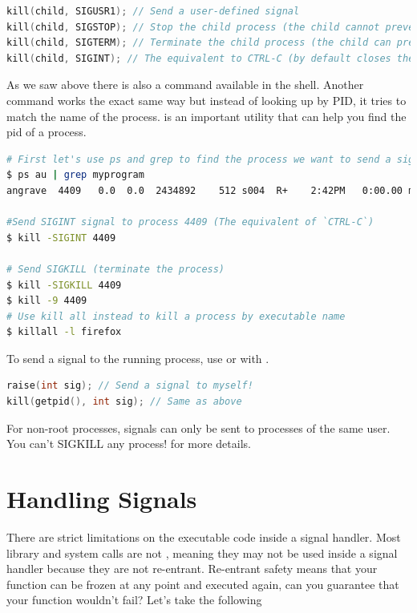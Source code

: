 \begin{lstlisting}[language=C]
kill(child, SIGUSR1); // Send a user-defined signal
kill(child, SIGSTOP); // Stop the child process (the child cannot prevent this)
kill(child, SIGTERM); // Terminate the child process (the child can prevent this)
kill(child, SIGINT); // The equivalent to CTRL-C (by default closes the process)
\end{lstlisting}

As we saw above there is also a  command available in the shell.
Another command  works the exact same way but instead of looking up by \gls{PID}, it tries to match the name of the process.
 is an important utility that can help you find the pid of a process.

\begin{lstlisting}[language=bash]
# First let's use ps and grep to find the process we want to send a signal to
$ ps au | grep myprogram
angrave  4409   0.0  0.0  2434892    512 s004  R+    2:42PM   0:00.00 myprogram 1 2 3

#Send SIGINT signal to process 4409 (The equivalent of `CTRL-C`)
$ kill -SIGINT 4409

# Send SIGKILL (terminate the process)
$ kill -SIGKILL 4409
$ kill -9 4409
# Use kill all instead to kill a process by executable name
$ killall -l firefox
\end{lstlisting}

To send a signal to the running process, use  or  with .

\begin{lstlisting}[language=C]
raise(int sig); // Send a signal to myself!
kill(getpid(), int sig); // Same as above
\end{lstlisting}

For non-root processes, signals can only be sent to processes of the same user.
You can't SIGKILL any process!
 for more details.

\section{Handling Signals}

There are strict limitations on the executable code inside a \gls{signal handler}.
Most library and system calls are not , meaning they may not be used inside a signal handler because they are not re-entrant.
Re-entrant safety means that your function can be frozen at any point and executed again, can you guarantee that your function wouldn't fail?
Let's take the following

